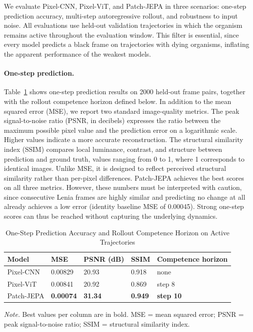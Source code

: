 We evaluate Pixel-CNN, Pixel-ViT, and Patch-JEPA in three scenarios: one-step prediction accuracy, multi-step autoregressive rollout, and robustness to input noise.
All evaluations use held-out validation trajectories in which the organism remains active throughout the evaluation window.
This filter is essential, since every model predicts a black frame on trajectories with dying organisms, inflating the apparent performance of the weakest models.

\paragraph{One-step prediction.} Table~\ref{tab:onestep} shows one-step prediction results on 2000 held-out frame pairs, together with the rollout competence horizon defined below.
In addition to the mean squared error (MSE), we report two standard image-quality
metrics.
The peak signal-to-noise ratio (PSNR, in decibels) expresses the ratio between the maximum possible pixel value and the prediction error on a logarithmic scale.
Higher values indicate a more accurate reconstruction.
The structural similarity index (SSIM) compares local luminance, contrast, and structure between prediction and ground truth, values ranging from 0 to 1, where 1 corresponds to identical images.
Unlike MSE, it is designed to reflect perceived structural similarity rather than per-pixel differences.
Patch-JEPA achieves the best scores on all three metrics.
However, these numbers must be interpreted with caution, since consecutive Lenia frames are highly similar and predicting no change at all already achieves a low error (identity baseline MSE of 0.00045).
Strong one-step scores can thus be reached without capturing the underlying dynamics.

\begin{table}[h]
\caption{One-Step Prediction Accuracy and Rollout Competence Horizon on Active Trajectories}
\label{tab:onestep}
\begin{tabular}{lllll}
\toprule
Model & MSE & PSNR (dB) & SSIM & Competence horizon \\
\midrule
Pixel-CNN & 0.00829 & 20.93 & 0.918 & none \\
Pixel-ViT & 0.00841 & 20.92 & 0.869 & step 8 \\
Patch-JEPA & \textbf{0.00074} & \textbf{31.34} & \textbf{0.949} & \textbf{step 10} \\
\bottomrule
\end{tabular}

\smallskip
\raggedright\small\textit{Note.} Best values per column are in bold. MSE = mean squared error; PSNR = peak signal-to-noise ratio; SSIM = structural similarity index.
    \end{table}

